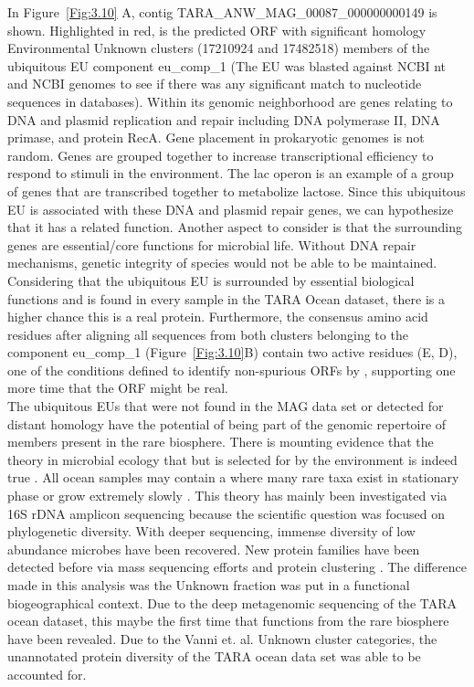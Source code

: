 In Figure~\ref{Fig:3.10} A, contig TARA\_ANW\_MAG\_00087\_000000000149 is shown. Highlighted in red, is the predicted ORF with significant homology Environmental Unknown clusters (17210924 and 17482518) members of the ubiquitous EU component eu\_comp\_1 (The EU was blasted against NCBI nt and NCBI genomes to see if there was any significant match to nucleotide sequences in databases). Within its genomic neighborhood are genes relating to DNA and plasmid replication and repair including DNA polymerase II, DNA primase, and protein RecA. Gene placement in prokaryotic genomes is not random. Genes are grouped together to increase transcriptional efficiency to respond to stimuli in the environment. The lac operon is an example of a group of genes that are transcribed together to metabolize lactose. Since this ubiquitous EU is associated with these DNA and plasmid repair genes, we can hypothesize that it has a related function. Another aspect to consider is that the surrounding genes are essential/core functions for microbial life. Without DNA repair mechanisms, genetic integrity of species would not be able to be maintained. Considering that the ubiquitous EU is surrounded by essential  biological functions and is found in every sample in the TARA Ocean dataset, there is a higher chance this is a real protein. Furthermore, the consensus amino acid residues after aligning all sequences from both clusters belonging to the component eu\_comp\_1 (Figure~\ref{Fig:3.10}B) contain two active residues (E, D), one of the conditions defined to identify non-spurious ORFs by \cite{Li_2008}, supporting one more time that the ORF might be real. \\

The ubiquitous EUs that were not found in the MAG data set or detected for distant homology have the potential of being part of the genomic repertoire of members present in the rare biosphere. There is mounting evidence that the theory in microbial ecology that  but is selected for by the environment is indeed true \citep{Gibbons_2013}. All ocean samples may contain a  where many rare taxa exist in stationary phase or grow extremely slowly \citep{ Pedros_2006}. This theory has mainly been investigated via 16S rDNA amplicon sequencing because the scientific question was focused on phylogenetic diversity. With deeper sequencing, immense diversity of low abundance microbes have been recovered. New protein families have been detected before via mass sequencing efforts and protein clustering \citep{Yooseph_2007}. The difference made in this analysis was the Unknown fraction was put in a functional biogeographical context. Due to the deep metagenomic sequencing of the TARA ocean dataset, this maybe the first time that  functions from the rare biosphere have been revealed. Due to the Vanni et. al. Unknown cluster categories, the unannotated protein diversity of the TARA ocean data set was able to be accounted for.\\